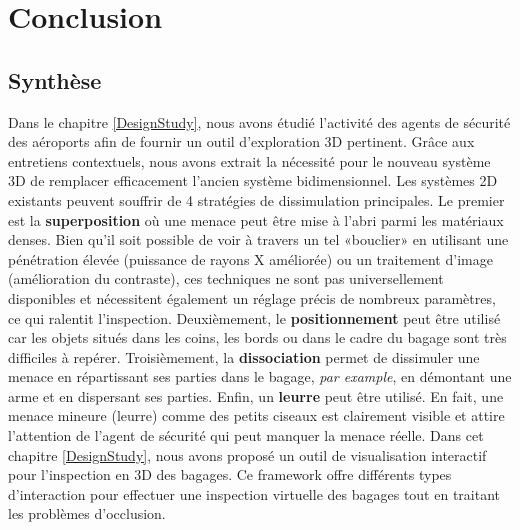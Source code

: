 \chapter{ Conclusion }
\label{Conclusion}

\section{Synthèse}

Dans le chapitre \ref{DesignStudy}, nous avons étudié l'activité des agents de sécurité des  aéroports afin de fournir un outil d'exploration 3D pertinent. Grâce aux entretiens contextuels, nous avons extrait la nécessité pour le nouveau système 3D de remplacer efficacement l'ancien système bidimensionnel. Les systèmes 2D existants peuvent souffrir de 4 stratégies de dissimulation principales. Le premier est la \textbf{superposition} où une menace peut être mise à l'abri parmi les matériaux denses. Bien qu'il soit possible de voir à travers un tel «bouclier» en utilisant une pénétration élevée (puissance de rayons X améliorée) ou un traitement d'image (amélioration du contraste), ces techniques ne sont pas universellement disponibles et nécessitent également un réglage précis de nombreux paramètres, ce qui ralentit l'inspection. Deuxièmement, le \textbf{positionnement} peut être utilisé car les objets situés dans les coins, les bords ou dans le cadre du bagage sont très difficiles à repérer. Troisièmement, la \textbf{dissociation} permet de dissimuler une menace en répartissant ses parties dans le bagage, \emph{par example}, en démontant une arme et en dispersant ses parties. Enfin, un \textbf{leurre} peut être utilisé. En fait, une menace mineure (leurre) comme des petits ciseaux est clairement visible et attire l’attention de l’agent de sécurité qui peut manquer la menace réelle. Dans cet chapitre \ref{DesignStudy}, nous avons proposé un outil de visualisation interactif pour l’inspection en 3D des bagages. Ce framework offre différents types d'interaction pour effectuer une inspection virtuelle des bagages tout en traitant les problèmes d'occlusion.

